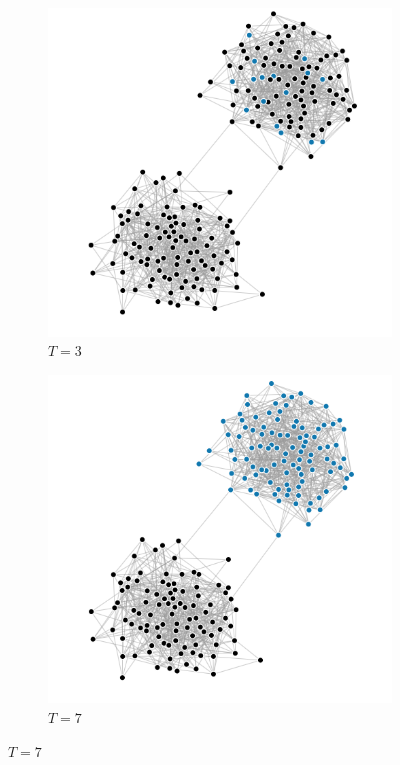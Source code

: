 \documentclass[10pt,journal,a4paper]{IEEEtran}
\begin{document}
\begin{figure}[h]
\centering

\begin{subfigure}[b]{.5\linewidth}
\includegraphics[width=1\linewidth]{figs/split-1}
\caption{$T=3$}
\end{subfigure}%
\begin{subfigure}[b]{.5\linewidth}
\includegraphics[width=1\linewidth]{figs/split-2}
\caption{$T=7$}
\end{subfigure}


\end{figure}
\end{document}
